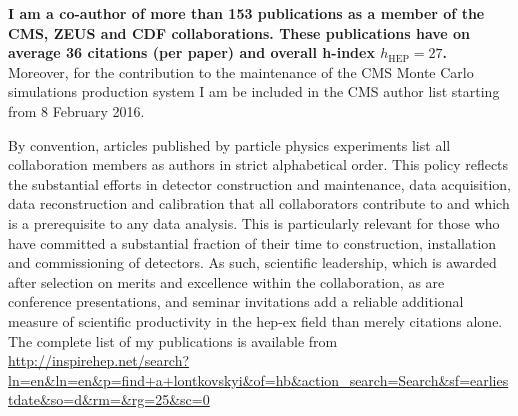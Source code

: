 \textbf{I am a co-author of more than 153 publications as a member of the CMS, ZEUS and CDF collaborations. These publications have on average 36 citations (per paper) and overall h-index  $h_\mathrm{HEP}=27$.} Moreover, for the contribution to the maintenance of the CMS Monte Carlo simulations production system I am be included in the CMS author list starting from 8 February 2016.

By convention, articles published by particle physics experiments list all collaboration members as authors in strict alphabetical order. This policy reflects the substantial efforts in detector construction and maintenance, data acquisition, data reconstruction and calibration that all collaborators contribute to and which is a prerequisite to any data analysis. This is particularly relevant for those who have committed a substantial fraction of their time to construction, installation and commissioning of detectors. As such, scientific leadership, which is awarded after selection on merits and excellence within the collaboration, as are conference presentations, and seminar invitations 
add a reliable additional measure of scientific productivity in the hep-ex field than merely citations alone.  The complete list of my publications is available from \url{http://inspirehep.net/search?ln=en&ln=en&p=find+a+lontkovskyi&of=hb&action_search=Search&sf=earliestdate&so=d&rm=&rg=25&sc=0}

